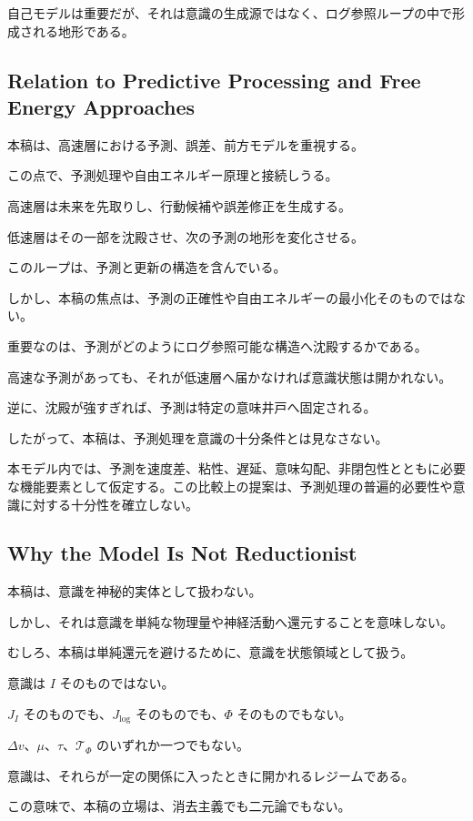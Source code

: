 自己モデルは重要だが、それは意識の生成源ではなく、ログ参照ループの中で形成される地形である。

\subsection{Relation to Predictive Processing and Free Energy Approaches}

本稿は、高速層における予測、誤差、前方モデルを重視する。

この点で、予測処理や自由エネルギー原理と接続しうる。

高速層は未来を先取りし、行動候補や誤差修正を生成する。

低速層はその一部を沈殿させ、次の予測の地形を変化させる。

このループは、予測と更新の構造を含んでいる。

しかし、本稿の焦点は、予測の正確性や自由エネルギーの最小化そのものではない。

重要なのは、予測がどのようにログ参照可能な構造へ沈殿するかである。

高速な予測があっても、それが低速層へ届かなければ意識状態は開かれない。

逆に、沈殿が強すぎれば、予測は特定の意味井戸へ固定される。

したがって、本稿は、予測処理を意識の十分条件とは見なさない。

本モデル内では、予測を速度差、粘性、遅延、意味勾配、非閉包性とともに必要な機能要素として仮定する。この比較上の提案は、予測処理の普遍的必要性や意識に対する十分性を確立しない。

\subsection{Why the Model Is Not Reductionist}

本稿は、意識を神秘的実体として扱わない。

しかし、それは意識を単純な物理量や神経活動へ還元することを意味しない。

むしろ、本稿は単純還元を避けるために、意識を状態領域として扱う。

意識は $I$ そのものではない。

$J_I$ そのものでも、$J_{\log}$ そのものでも、$\Phi$ そのものでもない。

$\Delta v$、$\mu$、$\tau$、$\mathcal{T}_{\Phi}$ のいずれか一つでもない。

意識は、それらが一定の関係に入ったときに開かれるレジームである。

この意味で、本稿の立場は、消去主義でも二元論でもない。

